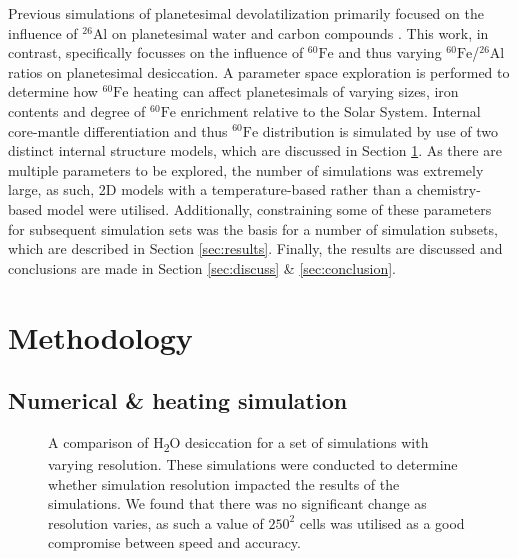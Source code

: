 \documentclass[fleqn,usenatbib]{mnras}
\newcommand{\tsu}[1]{\textsubscript{#1}}
\newcommand{\atom}[2]{$^{#2}\text{#1}$}
\newcommand{\al}{\atom{Al}{26}}
\newcommand{\fe}{\atom{Fe}{60}}
\newcommand{\water}{{H\tsu{2}O}}
\begin{document}
Previous simulations of planetesimal devolatilization primarily focused on the influence of \al{} on planetesimal water and carbon compounds \citep{lichtenbergWaterBudgetDichotomy2019,2021ApJ...913L..20L,2022ApJ...938L...3L}. This work, in contrast, specifically focusses on the influence of \fe{} and thus varying \fe{}/\al{} ratios on planetesimal desiccation.
A parameter space exploration is performed to determine how \fe{} heating can affect planetesimals of varying sizes, iron contents and degree of \fe{} enrichment relative to the Solar System.
Internal core-mantle differentiation and thus \fe{} distribution is simulated by use of two distinct internal structure models, which are discussed in Section \ref{sec:meth}.
As there are multiple parameters to be explored, the number of simulations was extremely large, as such, 2D models with a temperature-based rather than a chemistry-based model were utilised.
Additionally, constraining some of these parameters for subsequent simulation sets was the basis for a number of simulation subsets, which are described in Section \ref{sec:results}.
Finally, the results are discussed and conclusions are made in Section \ref{sec:discuss} \& \ref{sec:conclusion}.


\section{Methodology}
\label{sec:meth}

\subsection{Numerical \& heating simulation}


\begin{figure}
    \centering
    
    \caption{A comparison of \water{} desiccation for a set of simulations with varying resolution. These simulations were conducted to determine whether simulation resolution impacted the results of the simulations. We found that there was no significant change as resolution varies, as such a value of $250^2$ cells was utilised as a good compromise between speed and accuracy.}
    \label{fig:resolutions}
\end{figure}
\end{document}
